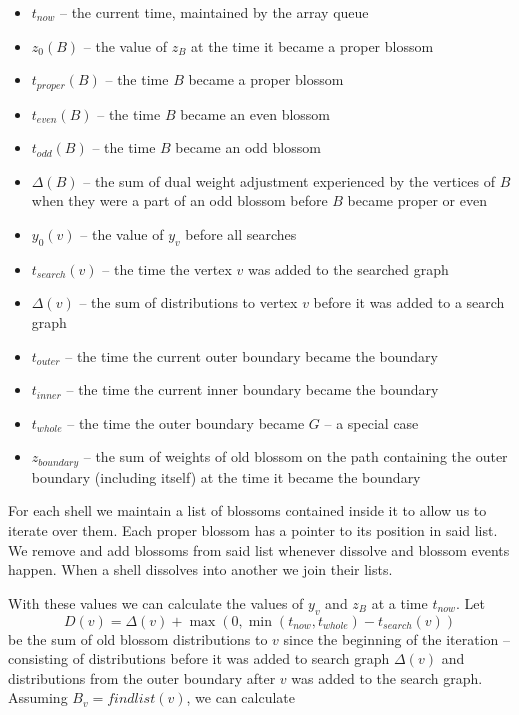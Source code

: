 \begin{itemize}
    \item $t_{now}$ – the current time, maintained by the array queue
    \item $z_0(B)$ – the value of $z_B$ at the time it became a proper blossom
    \item $t_{proper}(B)$ – the time $B$ became a proper blossom
    \item $t_{even}(B)$ – the time $B$ became an even blossom
    \item $t_{odd}(B)$ – the time $B$ became an odd blossom
    \item $\Delta(B)$ – the sum of dual weight adjustment experienced by the vertices of $B$ when they were a part of an odd blossom before $B$ became proper or even
    \item $y_0(v)$ – the value of $y_v$ before all searches
    \item $t_{search}(v)$ – the time the vertex $v$ was added to the searched graph
    \item $\Delta(v)$ – the sum of distributions to vertex $v$ before it was added to a search graph
    \item $t_{outer}$ – the time the current outer boundary became the boundary
    \item $t_{inner}$ – the time the current inner boundary became the boundary
    \item $t_{whole}$ – the time the outer boundary became $G$ – a special case
    \item $z_{boundary}$ – the sum of weights of old blossom on the path containing the outer boundary (including itself) at the time it became the boundary
\end{itemize}

For each shell we maintain a list of blossoms contained inside it to allow us to iterate over them. Each proper blossom has a pointer to its position in said list. We remove and add blossoms from said list whenever dissolve and blossom events happen. When a shell dissolves into another we join their lists.

With these values we can calculate the values of $y_v$ and $z_B$ at a time $t_{now}$. Let 
\[ D(v) = \Delta(v) + \max(0, \min(t_{now}, t_{whole}) - t_{search}(v)) \] 
be the sum of old blossom distributions to $v$ since the beginning of the iteration – consisting of distributions before it was added to search graph $\Delta(v)$ and distributions from the outer boundary after $v$ was added to the search graph. Assuming $B_v = findlist(v)$, we can calculate

